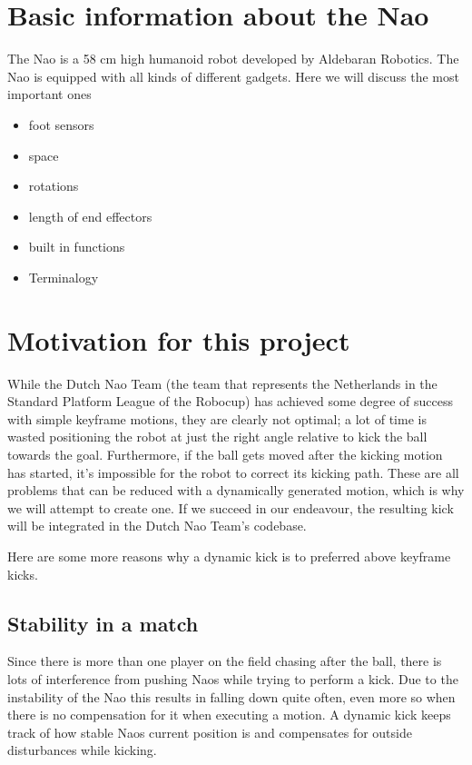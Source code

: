 \documentclass[a4paper]{article}
\begin{document}
\section{Basic information about the Nao}
The Nao is a 58 cm high humanoid robot developed by Aldebaran Robotics. The Nao
is equipped with all kinds of different gadgets. Here we will discuss the most
important ones 
\begin{itemize}
    \item foot sensors
    \item space
    \item rotations
    \item length of end effectors
    \item built in functions
    \item Terminalogy
\end{itemize}


\section{Motivation for this project} 
While the Dutch Nao Team (the team that represents the Netherlands in the Standard Platform League of the Robocup) has achieved some degree of success with simple keyframe motions, they are clearly not optimal; a lot of time is wasted positioning the robot at just the right angle relative to kick the ball towards the goal. Furthermore, if the ball gets moved after the kicking motion has started, it's impossible for the robot to correct its kicking path. These are all problems that can be reduced with a dynamically generated motion, which is why we will attempt to create one. If we succeed in our endeavour, the resulting kick will be integrated in the Dutch Nao Team's codebase. 

Here are some more reasons why a dynamic kick is to preferred above keyframe
kicks.

\subsection{Stability in a match}
Since there is more than one player on
the field  chasing after the ball,
there is lots of interference from pushing Naos while trying to perform a kick. Due to the
instability of the Nao this results in falling down quite often, even more
so when there is no compensation for it when executing a motion. A dynamic
kick keeps track of how stable Naos current position is and compensates for
outside disturbances while kicking. 
\end{document}
